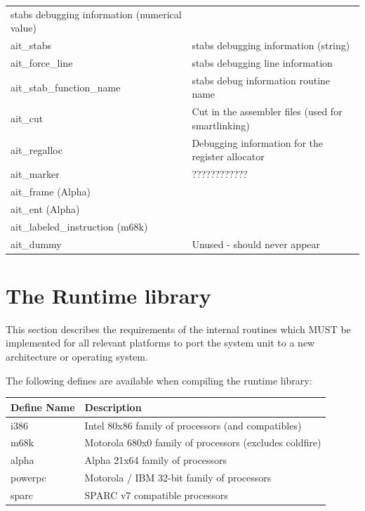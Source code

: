 \documentclass [a4paper,12pt]{article}
\begin{document}
\begin{longtable}{|l|p{10cm}|}
    stabs debugging information (numerical value) \\
ait{\_}stabs &
    stabs debugging information (string) \\
ait{\_}force{\_}line&
    stabs debugging line information \\
ait{\_}stab{\_}function{\_}name&
    stabs debug information routine name \\
ait{\_}cut&
    Cut in the assembler files (used for smartlinking) \\
ait{\_}regalloc&
    Debugging information for the register allocator \\
ait{\_}marker  & ???????????? \\
ait{\_}frame (Alpha)&  \\
ait{\_}ent (Alpha)&  \\
ait{\_}labeled{\_}instruction (m68k)&  \\
ait{\_}dummy & Unused - should never appear
\end{longtable}

\section{The Runtime library}
\label{sec:mylabel9}

This section describes the requirements of the internal routines which MUST
be implemented for all relevant platforms to port the system unit to a new
architecture or operating system.

The following defines are available when compiling the runtime library:

\begin{longtable}{|l|p{10cm}|}
\hline
Define Name & Description \\
\hline
\endhead
\hline
\endfoot
i386        & Intel 80x86 family of processors (and compatibles) \\
m68k        & Motorola 680x0 family of processors (excludes coldfire) \\
alpha       & Alpha 21x64 family of processors \\
powerpc     & Motorola / IBM 32-bit family of processors \\
sparc       & SPARC v7 compatible processors
\end{longtable}
\end{document}
